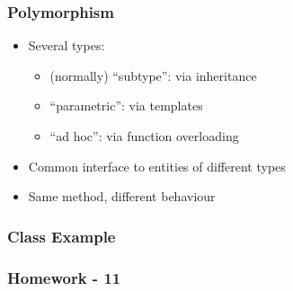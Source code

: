 \hypertarget{polymorphism}{%
\subsubsection{Polymorphism}\label{polymorphism}}

\begin{itemize}
\tightlist
\item
  Several types:

  \begin{itemize}
  \tightlist
  \item
    (normally) ``subtype'': via inheritance
  \item
    ``parametric'': via templates
  \item
    ``ad hoc'': via function overloading
  \end{itemize}
\item
  Common interface to entities of different types
\item
  Same method, different behaviour
\end{itemize}

\hypertarget{class-example-3}{%
\subsubsection{Class Example}\label{class-example-3}}

\begin{Shaded}
\begin{Highlighting}[]
\NormalTok{\{}

  \NormalTok{;}

\NormalTok{);}
\NormalTok{);}
\NormalTok{\}}
\end{Highlighting}
\end{Shaded}

\hypertarget{homework---11}{%
\subsubsection{Homework - 11}\label{homework---11}}

